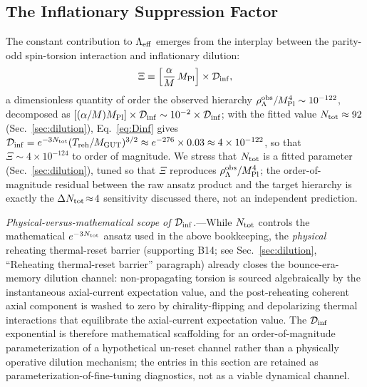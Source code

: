 \documentclass[aps,prd,twocolumn,superscriptaddress,showpacs,preprintnumbers,nofootinbib,longbibliography,floatfix]{revtex4-2}
\newcommand{\Leff}{\Lambda_{\rm eff}}
\newcommand{\Dinf}{\mathcal{D}_{\rm inf}}
\newcommand{\MPl}{M_{\rm Pl}}
\begin{document}
\subsection{The Inflationary Suppression Factor}\label{sec:gdp}

The constant contribution to $\Leff$ emerges from the interplay between the
parity-odd spin-torsion interaction and inflationary dilution:
\begin{equation}\label{eq:gdp}
\Xi \equiv \left[\frac{\alpha}{M}\,\MPl\right]\times\Dinf,
\end{equation}
a dimensionless quantity of order the observed hierarchy
$\rho_\Lambda^{\rm obs}/\MPl^4 \sim 10^{-122}$, decomposed as
$[(\alpha/M)\MPl]\times\Dinf \sim 10^{-2}\times\Dinf$; with the fitted
value $N_{\rm tot}\approx 92$ (Sec.~\ref{sec:dilution}), Eq.~\eqref{eq:Dinf}
gives $\Dinf = e^{-3N_{\rm tot}}(T_{\rm reh}/M_{\rm GUT})^{3/2}
\approx e^{-276}\times 0.03 \approx 4\times 10^{-122}$, so that
$\Xi\sim 4\times 10^{-124}$ to order of magnitude. We stress that
$N_{\rm tot}$ is a fitted parameter (Sec.~\ref{sec:dilution}), tuned so that
$\Xi$ reproduces $\rho_\Lambda^{\rm obs}/\MPl^4$; the order-of-magnitude
residual between the raw ansatz product and the target hierarchy is exactly
the $\Delta N_{\rm tot}\!\approx\!4$ sensitivity discussed there, not an
independent prediction.

\textit{Physical-versus-mathematical scope of $\Dinf$.}---While
$N_{\rm tot}$ controls the mathematical $e^{-3N_{\rm tot}}$ ansatz
used in the above bookkeeping, the \emph{physical} reheating
thermal-reset barrier (supporting B14; see Sec.~\ref{sec:dilution},
``Reheating thermal-reset barrier'' paragraph) already closes the
bounce-era-memory dilution channel: non-propagating torsion is sourced
algebraically by the instantaneous axial-current expectation value,
and the post-reheating coherent axial component is washed to zero by
chirality-flipping and depolarizing thermal interactions that equilibrate
the axial-current expectation value. The $\Dinf$ exponential is
therefore mathematical scaffolding for an order-of-magnitude
parameterization of a hypothetical un-reset channel rather than a
physically operative dilution mechanism; the entries in this section
are retained as parameterization-of-fine-tuning diagnostics, not as
a viable dynamical channel.
\end{document}
